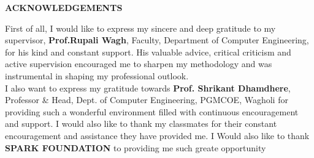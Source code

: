 \thispagestyle{plain}

\begin{center}
 \Large {\bf \uppercase{Acknowledgements}}
\end{center}

\vspace{3\baselineskip}

\justify
\noindent
First of all, I would like to express my sincere  and deep gratitude to my supervisor, \textbf{Prof.Rupali Wagh}, Faculty, Department of Computer Engineering, for his kind and constant support. His valuable advice, critical criticism and active supervision encouraged me to sharpen my methodology and was instrumental in shaping my professional outlook.\\

I also want to express my gratitude towards \textbf{Prof. Shrikant Dhamdhere}, Professor \& Head, Dept. of Computer Engineering, PGMCOE, Wagholi for providing such a wonderful environment filled with continuous encouragement and support. I would also like to thank my classmates for their constant encouragement and assistance they have provided me.  I Would also like to thank \textbf{SPARK FOUNDATION }  to providing me such greate opportunity\\[4cm]
 
